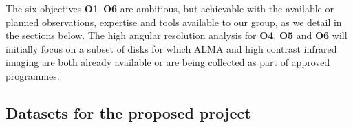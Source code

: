 \documentclass[10pt,fleqn,twoside]{article}
\begin{document}
\begin{table}
\caption{Relationship between the six objectives of this project {\bf O1}--{\bf O6}, in combination of the outcome of other projects in the Research Unit, and the four outstanding questions outlined in Sect.~\ref{s_state_art}.}
\label{t_obj_quest}
\resizebox{\textwidth}{!}{
\begin{tabular}{|l|cccccc|ccccccc|}
\hline
                 & \multicolumn{6}{|c|}{Objectives of this project}      &\multicolumn{7}{|c|}{Other RU Projects} \\ 
    Question             &{\bf O1}&{\bf O2}&{\bf O3}&{\bf O4}&{\bf O5}&{\bf O6}&{\bf A2}&{\bf B1}&{\bf B2}&{\bf C1}&{\bf C2}&{\bf D1}&{\bf D2} \\
\hline
{\bf Q1}: Dust evolution  &\checkmark &\checkmark &          &\checkmark &           &           &
           &           &           &
\checkmark &\checkmark &
\checkmark &           \\
{\bf Q2}: Gas evolution  &           &           &\checkmark &           &\checkmark &           &
\checkmark &\checkmark &\checkmark &
\checkmark &           &
           &\checkmark \\
{\bf Q3}: Disk-wind-accretion  &           &           &\checkmark &           &\checkmark &\checkmark &
\checkmark &\checkmark &\checkmark &
           &\checkmark &
           &           \\
{\bf Q4}: Disk-planet interaction &           &           &           &\checkmark &\checkmark &\checkmark &         
           &           &           &
           &           &
\checkmark &\checkmark \\
\hline
\end{tabular}
}
\end{table}

The six objectives {\bf O1}--{\bf O6} are ambitious, but achievable with the available or planned observations, expertise and tools available to our group, as we detail in the sections below. The high angular resolution analysis for {\bf O4}, {\bf O5} and {\bf O6} will initially focus on a subset of disks for which ALMA and high contrast infrared imaging are both already available or are being collected as part of approved programmes. 

\subsection{Datasets for the proposed project}
\label{s_data}
\end{document}
